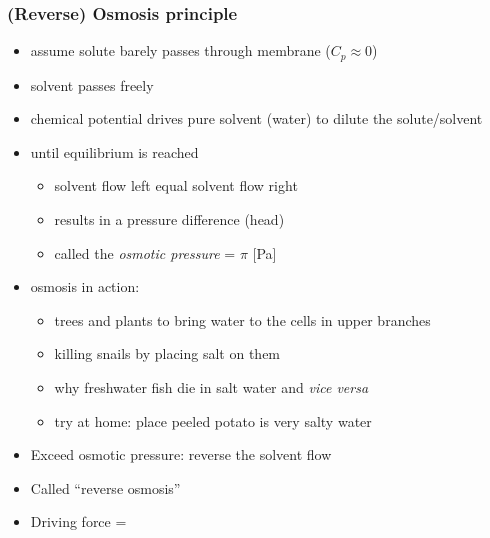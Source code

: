\begin{frame}\frametitle{(Reverse) Osmosis principle}
	\begin{itemize}
		\item	assume solute barely passes through membrane ($C_p \approx 0$)
		\item	solvent passes freely
		\item	chemical potential drives pure solvent (water) to dilute the solute/solvent
		\item	until equilibrium is reached
			\begin{itemize}
				\item	solvent flow left equal solvent flow right
				\item	results in a pressure difference (head)
				\item	called the \emph{osmotic pressure} = $\pi$ [Pa]
			\end{itemize}		
		\item	osmosis in action:
		\begin{itemize}
			\item	trees and plants to bring water to the cells in upper branches
			\item	killing snails by placing salt on them
			\item	why freshwater fish die in salt water and \emph{vice versa}
			\item	try at home: place peeled potato is very salty water
		\end{itemize}
		\item	Exceed osmotic pressure: reverse the solvent flow
		\item	Called ``reverse osmosis''
		\item	Driving force = \underline{$\qquad\qquad\qquad$}
	\end{itemize}	
\end{frame}

